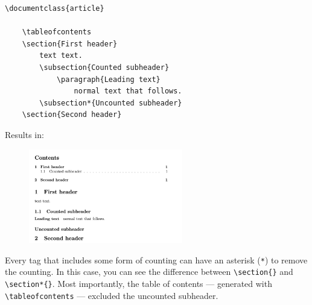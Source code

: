 \begin{lstlisting}[caption=\texttt{example2.tex}]
\documentclass{article}

    \tableofcontents
    \section{First header}
        text text.
        \subsection{Counted subheader}
            \paragraph{Leading text}
                normal text that follows.
        \subsection*{Uncounted subheader}
    \section{Second header}

\end{lstlisting}

Results in:
\begin{figure}[h]
    \centering
    \includegraphics[width=0.6\textwidth]{figures/sections.png}
    \label{fig:sections}
\end{figure}

Every tag that includes some form of counting can have an asterisk (\verb|*|) to remove the counting.
In this case, you can see the difference between \verb|\section{}| and \verb|\section*{}|.
Most importantly, the table of contents --- generated with \verb|\tableofcontents| --- excluded the uncounted subheader.

